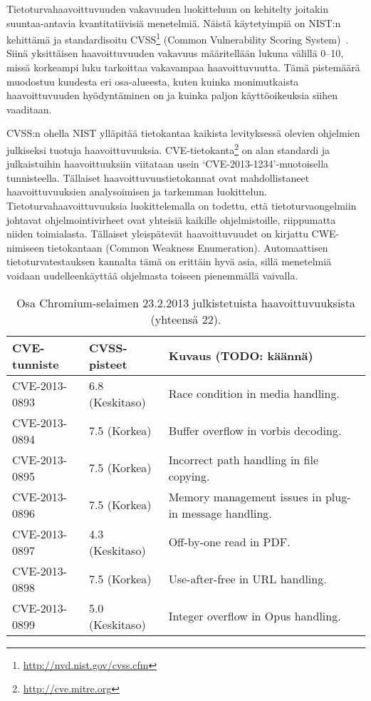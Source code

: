 Tietoturvahaavoittuvuuden vakavuuden luokitteluun on kehitelty joitakin suuntaa-antavia kvantitatiivisiä menetelmiä.
Näistä käytetyimpiä on NIST:n kehittämä ja standardisoitu CVSS\footnote{\url{http://nvd.nist.gov/cvss.cfm}} (Common Vulnerability Scoring System)~\cite{CVSS}.
Siinä yksittäisen haavoittuvuuden vakavuus määritellään lukuna välillä 0--10,
missä korkeampi luku tarkoittaa vakavampaa haavoittuvuutta.
Tämä pistemäärä muodostuu kuudesta eri osa-alueesta,
kuten kuinka monimutkaista haavoittuvuuden hyödyntäminen on ja kuinka paljon käyttöoikeuksia siihen vaaditaan.

CVSS:n ohella NIST ylläpitää tietokantaa kaikista levityksessä olevien ohjelmien julkiseksi tuotuja haavoittuvuuksia.
CVE-tietokanta\footnote{\url{http://cve.mitre.org}} on alan standardi ja julkaistuihin haavoittuuksiin viitataan usein `CVE-2013-1234'-muotoisella tunnisteella.
Tällaiset haavoittuvuustietokannat ovat mahdollistaneet haavoittuvuuksien analysoimisen ja tarkemman luokittelun.
Tietoturvahaavoittuvuuksia luokittelemalla on todettu,
että tietoturvaongelmiin johtavat ohjelmointivirheet ovat yhteisiä kaikille ohjelmistoille,
riippumatta niiden toimialasta.
Tällaiset yleispätevät haavoittuvuudet on kirjattu CWE-nimiseen tietokantaan (Common Weakness Enumeration).
Automaattisen tietoturvatestauksen kannalta tämä on erittäin hyvä asia,
sillä menetelmiä voidaan uudelleenkäyttää ohjelmasta toiseen pienemmällä vaivalla.

\begin{table}
\label{chromiumTaulukko}
\begin{tabular}{l|l|l}
    CVE-tunniste  & CVSS-pisteet    & Kuvaus (TODO: käännä) \\ \hline
%
    CVE-2013-0893 & 6.8 (Keskitaso) & Race condition in media handling.                       \\
    CVE-2013-0894 & 7.5 (Korkea)    & Buffer overflow in vorbis decoding.                     \\
    CVE-2013-0895 & 7.5 (Korkea)    & Incorrect path handling in file copying.                \\
    CVE-2013-0896 & 7.5 (Korkea)    & Memory management issues in plug-in message handling.   \\
    CVE-2013-0897 & 4.3 (Keskitaso) & Off-by-one read in PDF.                                 \\
    CVE-2013-0898 & 7.5 (Korkea)    & Use-after-free in URL handling.                         \\
    CVE-2013-0899 & 5.0 (Keskitaso) & Integer overflow in Opus handling.                      \\
\end{tabular}
\caption{Osa Chromium-selaimen 23.2.2013 julkistetuista haavoittuvuuksista (yhteensä 22).}
\end{table}


